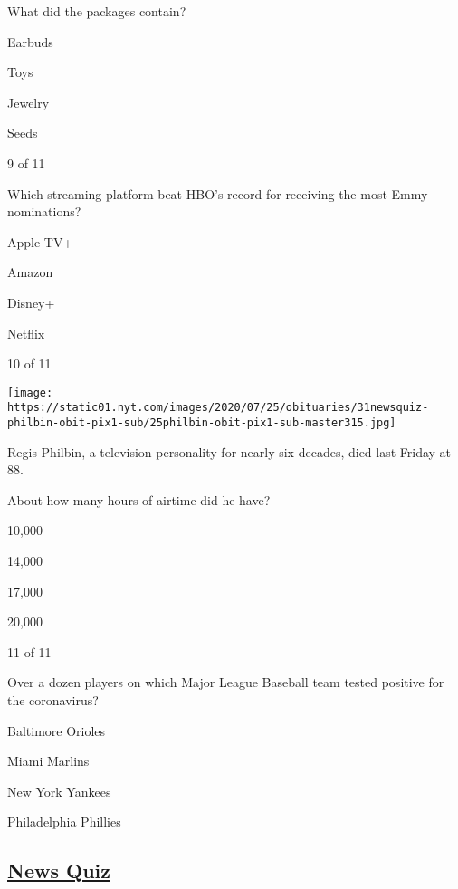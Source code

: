 What did the packages contain?

Earbuds

Toys

Jewelry

Seeds

9 of 11

Which streaming platform beat HBO's record for receiving the most Emmy
nominations?

Apple TV+

Amazon

Disney+

Netflix

10 of 11

\texttt{[image: https://static01.nyt.com/images/2020/07/25/obituaries/31newsquiz-philbin-obit-pix1-sub/25philbin-obit-pix1-sub-master315.jpg]}

Regis Philbin, a television personality for nearly six decades, died
last Friday at 88.

About how many hours of airtime did he have?

10,000

14,000

17,000

20,000

11 of 11

Over a dozen players on which Major League Baseball team tested positive
for the coronavirus?

Baltimore Orioles

Miami Marlins

New York Yankees

Philadelphia Phillies

\hypertarget{news-quiz}{%
\subsection{\texorpdfstring{\href{https://www.nytimes.com/spotlight/news-quiz}{News
Quiz}}{News Quiz}}\label{news-quiz}}

